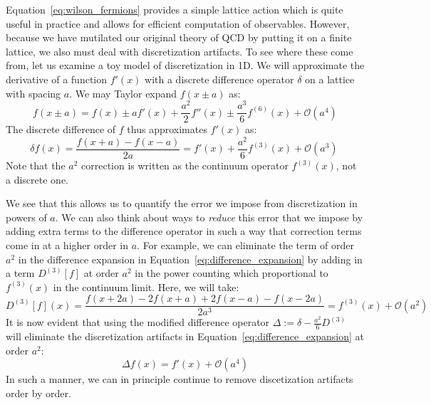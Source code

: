 \documentclass[11pt, oneside]{article}   	%
\theoremstyle{definition}
\begin{document}
Equation~\ref{eq:wilson_fermions} provides a simple lattice action which is quite useful in practice and allows for efficient 
computation of observables. However, because we have mutilated our original theory of QCD by putting it on a finite lattice, 
we also must deal with discretization artifacts. To see where these come from, let us examine a toy model of discretization 
in 1D. We will approximate the derivative of a function $f'(x)$ with a discrete difference operator $\delta$ on a lattice 
with spacing $a$. We may Taylor expand $f(x \pm a)$ as:
\begin{equation}
	f(x\pm a) = f(x) \pm a f'(x) + \frac{a^2}{2}f''(x) \pm \frac{a^3}{6} f^{(6)}(x) + \mathcal O(a^4)
\end{equation}
The discrete difference of $f$ thus approximates $f'(x)$ as:
\begin{equation}
	\delta f(x) = \frac{f(x + a) - f(x - a)}{2a} = f'(x) + \frac{a^2}{6} f^{(3)}(x) + \mathcal O(a^3)~
	\label{eq:difference_expansion}
\end{equation}
Note that the $a^2$ correction is written as the continuum operator $f^{(3)}(x)$, not a discrete one. 

We see that this allows us to quantify the error we impose from discretization in powers of $a$. We can also think about 
ways to \textit{reduce} this error that we impose by adding extra terms to the difference operator in such a way 
that correction terms come in at a higher order in $a$. For example, we can eliminate the term of order $a^2$ in the 
difference expansion in Equation~\ref{eq:difference_expansion} by adding in a term $D^{(3)}[f]$ at order $a^2$ in the power 
counting which proportional to $f^{(3)}(x)$ in the continuum limit. Here, we will take:
\begin{equation}
	D^{(3)}[f](x) = \frac{f(x + 2a) - 2f(x + a) + 2f(x - a) - f(x - 2a)}{2a^3} = f^{(3)}(x) + \mathcal O(a^2)
\end{equation}
It is now evident that using the modified difference operator $\Delta := \delta - \frac{a^2}{6}D^{(3)}$ will eliminate the 
discretization artifacts in Equation~\ref{eq:difference_expansion} at order $a^2$:
\begin{equation}
	\Delta f(x) = f'(x) + \mathcal O(a^4)
\end{equation}
In such a manner, we can in principle continue to remove discetization artifacts order by order. 
\end{document}
